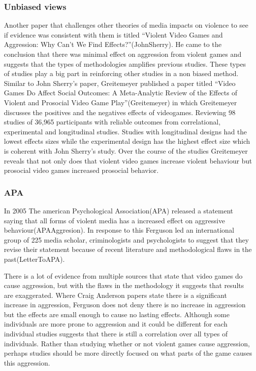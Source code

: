 \documentclass[journal]{IEEEtran}
\begin{document}
    \subsubsection{Unbiased views}
        Another paper that challenges other theories of media impacts on violence to see if evidence was consistent with them is titled “Violent Video Games and Aggression: Why Can't We Find Effects?”(JohnSherry). He came to the conclusion that there was minimal effect on aggression from violent games and suggests that the types of methodologies amplifies previous studies. These types of studies play a big part in reinforcing other studies in a non biased method.  Similar to John Sherry’s paper, Greitemeyer published a paper titled “Video Games Do Affect Social Outcomes: A Meta-Analytic Review of the Effects of Violent and Prosocial Video Game Play”(Greitemeyer) in which Greitemeyer discusses the positives and the negatives effects of videogames. Reviewing 98 studies of 36,965 participants with reliable outcomes from correlational, experimental and longitudinal studies. Studies with longitudinal designs had the lowest effects sizes while the experimental design has the highest effect size which is coherent with John Sherry’s study. Over the course of the studies Greitemeyer reveals that not only does that violent video games increase violent behaviour but prosocial video games increased prosocial behavior.
    \subsubsection{APA}
        In 2005 The american Psychological Association(APA) released a statement saying that all forms of violent media has a increased effect on aggressive behaviour(APAAggresion). In response to this Ferguson led an international group of 225 media scholar, criminologists and psychologists to suggest that they revise their statement because of recent literature and methodological flaws in the past(LetterToAPA). 

There is a lot of evidence from multiple sources that state that video games do cause aggression, but with the flaws in the methodology it suggests that results are exaggerated. Where Craig Anderson papers state there is a significant increase in aggression, Ferguson does not deny there is no increase in aggression but the effects are small enough to cause no lasting effects. Although some individuals are more prone to aggression and it could be different for each individual studies suggests that there is still a correlation over all types of individuals. Rather than studying whether or not violent games cause aggression, perhaps studies should be more directly focused on what parts of the game causes this aggression.
\end{document}
